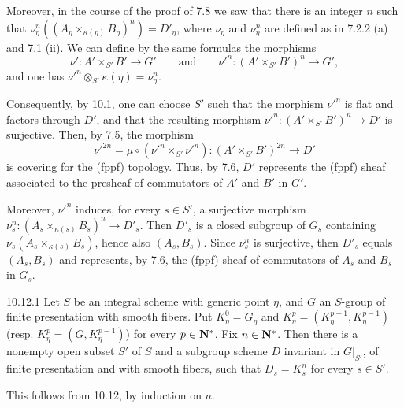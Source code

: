 Moreover, in the course of the proof of 7.8 we saw that there is an integer $n$ such that $\nu_\eta^n((A_\eta\times_{\kappa(\eta)}B_\eta)^n)=D'_\eta$, where $\nu_\eta$ and $\nu_\eta^n$ are defined as in 7.2.2 (a) and 7.1 (ii). We can define by the same formulas the morphisms
\[
\nu':A'\times_{S'}B'\to G'\qquad\text{and}\qquad\nu'^n:(A'\times_{S'}B')^n\to G',
\]
and one has $\nu'^n\otimes_{S'}\kappa(\eta)=\nu_\eta^n$.

Consequently, by 10.1, one can choose $S'$ such that the morphism $\nu'^n$ is flat and factors through $D'$, and that the resulting morphism $\nu'^n:(A'\times_{S'}B')^n\to D'$ is surjective. Then, by 7.5, the morphism
\[
\nu'^{2n}=\mu\circ(\nu'^n\times_{S'}\nu'^n):(A'\times_{S'}B')^{2n}\to D'
\]
is covering for the (fppf) topology. Thus, by 7.6, $D'$ represents the (fppf) sheaf associated to the presheaf of commutators of $A'$ and $B'$ in $G'$.

Moreover, $\nu'^n$ induces, for every $s\in S'$, a surjective morphism $\nu_s^n:(A_s\times_{\kappa(s)}B_s)^n\to D'_s$. Then $D'_s$ is a closed subgroup of $G_s$ containing $\nu_s(A_s\times_{\kappa(s)}B_s)$, hence also $(A_s,B_s)$. Since $\nu_s^n$ is surjective, then $D'_s$ equals $(A_s,B_s)$ and represents, by 7.6, the (fppf) sheaf of commutators of $A_s$ and $B_s$ in $G_s$.

\begin{corollary}{10.12.1}\label{VIB.10.12.1}
Let $S$ be an integral scheme with generic point $\eta$, and $G$ an $S$-group of finite presentation with smooth fibers. Put $K_\eta^0=G_\eta$ and $K_\eta^p=(K_\eta^{p-1},K_\eta^{p-1})$ (resp. $K_\eta^p=(G,K_\eta^{p-1})$) for every $p\in\mathbf{N}^*$. Fix $n\in\mathbf{N}^*$. Then there is a nonempty open subset $S'$ of $S$ and a subgroup scheme $D$ invariant in $G|_{S'}$, of finite presentation and with smooth fibers, such that $D_s=K_s^n$ for every $s\in S'$.
\end{corollary}
This follows from 10.12, by induction on $n$.

